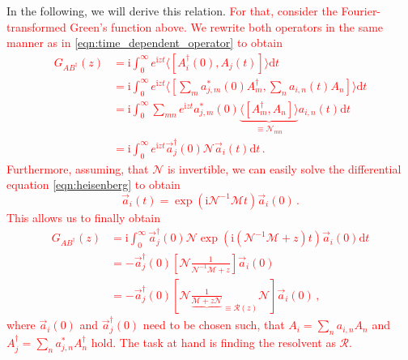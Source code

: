 \documentclass[
    reprint, 
    aps,
    preprintnumbers,
    twocolumn,
    prb,
    superscriptaddress
]{revtex4-2}
\newcommand{\im}{\mathrm{i}}
\newcommand{\mM}{\mathcal{M}}
\newcommand{\mN}{\mathcal{N}}
\begin{document}
In the following, we will derive this relation.
\textcolor{red}{For that, consider the Fourier-transformed Green's function above.
We rewrite both operators in the same manner as in \eqref{eqn:time_dependent_operator} to obtain
\begin{align}
    G_{AB^\dagger} (z) &= \im \int_0^\infty e^{\im z t} \langle [ A_i^\dagger(0), A_j(t) ] \rangle \mathrm{d}t \nonumber \\
        &= \im \int_0^\infty e^{\im z t} \langle [ \sum_m a_{j,m}^*(0) A_m^\dagger, \sum_n a_{i,n}(t) A_n ] \rangle \mathrm{d}t \nonumber \\
        &= \im \int_0^\infty \sum_{mn} e^{\im z t} a_{j,m}^*(0) \underbrace{\langle [ A_m^\dagger, A_n ] \rangle}_{\equiv \mN_{mn}} a_{i,n}(t) \mathrm{d}t \nonumber \\
        &= \im \int_0^\infty e^{\im z t} \vec{a}_{j}^\dagger (0) \mN \vec{a}_{i}(t) \mathrm{d}t\,.
\end{align}
Furthermore, assuming, that $\mN$ is invertible, we can easily solve the differential equation \eqref{eqn:heisenberg} to obtain
\begin{equation}
    \vec{a}_{i}(t) = \exp \left( \im \mN^{-1} \mM t \right) \vec{a}_{i}(0)\,.
\end{equation}
This allows us to finally obtain
\begin{align}
    \label{eqn:green_derivation}
    G_{AB^\dagger} (z) &= \im  \int_0^\infty \vec{a}_{j}^\dagger (0) \mN \exp \left( \im \left(\mN^{-1} \mM + z \right) t \right) \vec{a}_{i}(0) \mathrm{d}t  \nonumber \\
        &= - \vec{a}_{j}^\dagger (0) \left[ \mN \frac{1}{\mN^{-1} \mM + z} \right] \vec{a}_{i}(0) \nonumber \\
        &= - \vec{a}_{j}^\dagger (0) \left[ \mN \frac{1}{ \underbrace{\mM + z \mN}}_{\equiv \mathcal{R}(z)} \mN \right] \vec{a}_{i}(0)\,,
\end{align}
where $\vec{a}_i(0)$ and $\vec{a}_j^\dagger (0)$ need to be chosen such, that $A_i = \sum_n a_{i,n} A_n$ and $A_j^\dagger = \sum_n a_{j,n}^* A_n^\dagger$ hold.
The task at hand is finding the resolvent as $\mathcal{R}$.}
\end{document}
